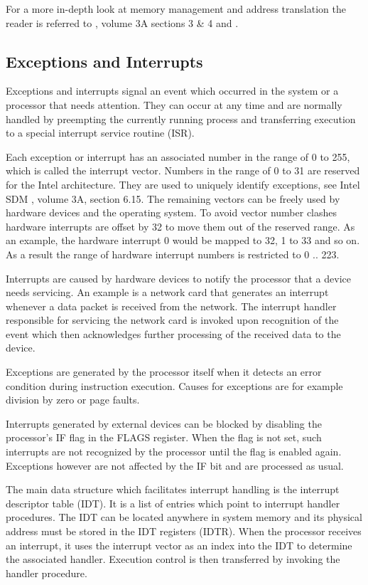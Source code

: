 For a more in-depth look at memory management and address translation the reader
is referred to \cite{IntelSDM}, volume 3A sections 3 \& 4 and
\cite{Drepper07whatevery}.

\subsection{Exceptions and Interrupts}\label{subsec:exceptions-interrupts}
Exceptions and interrupts signal an event which occurred in the system or a
processor that needs attention. They can occur at any time and are normally
handled by preempting the currently running process and transferring execution
to a special interrupt service routine (ISR).

Each exception or interrupt has an associated number in the range of 0 to 255,
which is called the interrupt vector. Numbers in the range of 0 to 31 are
reserved for the Intel architecture. They are used to uniquely identify
exceptions, see Intel SDM \cite{IntelSDM}, volume 3A, section 6.15.  The
remaining vectors can be freely used by hardware devices and the operating
system. To avoid vector number clashes hardware interrupts are offset by 32 to
move them out of the reserved range. As an example, the hardware interrupt 0
would be mapped to 32, 1 to 33 and so on. As a result the range of hardware
interrupt numbers is restricted to 0 .. 223.

Interrupts are caused by hardware devices to notify the processor that a device
needs servicing. An example is a network card that generates an interrupt
whenever a data packet is received from the network. The interrupt handler
responsible for servicing the network card is invoked upon recognition of the
event which then acknowledges further processing of the received data to the
device.

Exceptions are generated by the processor itself when it detects an error
condition during instruction execution. Causes for exceptions are for example
division by zero or page faults.

Interrupts generated by external devices can be blocked by disabling the
processor's IF flag in the FLAGS register. When the flag is not set, such
interrupts are not recognized by the processor until the flag is enabled again.
Exceptions however are not affected by the IF bit and are processed as usual.

The main data structure which facilitates interrupt handling is the interrupt
descriptor table (IDT). It is a list of entries which point to
interrupt handler procedures. The IDT can be located anywhere in system memory
and its physical address must be stored in the IDT registers (IDTR). When the
processor receives an interrupt, it uses the interrupt vector as an index into
the IDT to determine the associated handler. Execution control is then
transferred by invoking the handler procedure.

